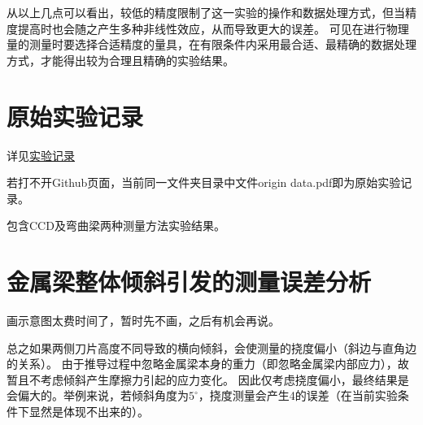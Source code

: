 \documentclass[12pt, a4paper]{ctexart}
\begin{document}
从以上几点可以看出，较低的精度限制了这一实验的操作和数据处理方式，但当精度提高时也会随之产生多种非线性效应，从而导致更大的误差。
可见在进行物理量的测量时要选择合适精度的量具，在有限条件内采用最合适、最精确的数据处理方式，才能得出较为合理且精确的实验结果。

\appendix
\section{原始实验记录}
详见\href{https://github.com/oFtangcY/-/blob/main/1.8%E6%9D%A8%E6%B0%8F%E6%A8%A1%E9%87%8F/origin%20data.pdf}{实验记录}

若打不开Github页面，当前同一文件夹目录中文件origin data.pdf即为原始实验记录。

包含CCD及弯曲梁两种测量方法实验结果。

\section{金属梁整体倾斜引发的测量误差分析}
\label{appendix:附录B}
画示意图太费时间了，暂时先不画，之后有机会再说。

总之如果两侧刀片高度不同导致的横向倾斜，会使测量的挠度偏小（斜边与直角边的关系）。
由于推导过程中忽略金属梁本身的重力（即忽略金属梁内部应力），故暂且不考虑倾斜产生摩擦力引起的应力变化。
因此仅考虑挠度偏小，最终结果是会偏大的。举例来说，若倾斜角度为$5^\circ$，挠度测量会产生4\textperthousand 的误差（在当前实验条件下显然是体现不出来的）。
\end{document}

